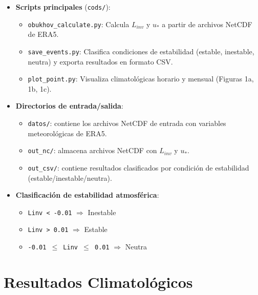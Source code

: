 \documentclass[11pt]{article}
\begin{document}
\begin{itemize}
    \item \textbf{Scripts principales} (\texttt{cods/}):
    \begin{itemize}
        \item \texttt{obukhov\_calculate.py}: Calcula $L_{inv}$ y $u_*$ a partir de archivos NetCDF de ERA5.
        \item \texttt{save\_events.py}: Clasifica condiciones de estabilidad (estable, inestable, neutra) y exporta resultados en formato CSV.
        \item \texttt{plot\_point.py}: Visualiza climatológicas horario y mensual (Figuras 1a, 1b, 1c).
    \end{itemize}

    \item \textbf{Directorios de entrada/salida}:
    \begin{itemize}
        \item \texttt{datos/}: contiene los archivos NetCDF de entrada con variables meteorológicas de ERA5.
        \item \texttt{out\_nc/}: almacena archivos NetCDF con $L_{inv}$ y $u_*$.
        \item \texttt{out\_csv/}: contiene resultados clasificados por condición de estabilidad (estable/inestable/neutra).
    \end{itemize}

    \item \textbf{Clasificación de estabilidad atmosférica}:
    \begin{itemize}
        \item \texttt{Linv < -0.01} $\Rightarrow$ Inestable
        \item \texttt{Linv > 0.01} $\Rightarrow$ Estable
        \item \texttt{-0.01 $\leq$ Linv $\leq$ 0.01} $\Rightarrow$ Neutra
    \end{itemize}
\end{itemize}

\section{Resultados Climatológicos}
\end{document}
